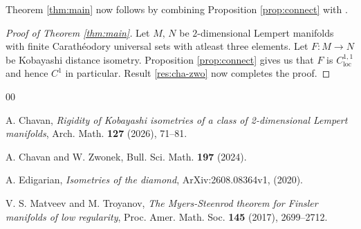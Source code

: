 \documentclass[12pt]{amsart}
\numberwithin{equation}{section}
\theoremstyle{remark}
\begin{document}
Theorem \ref{thm:main} now follows by combining Proposition \ref{prop:connect} with 
\cite[~Theorem 2]{cha-zwo}.

\begin{proof}[Proof of Theorem \ref{thm:main}]
	Let $M,\,N$ be $2$-dimensional Lempert manifolds with finite Carath\'{e}odory
	 universal sets with atleast three elements. Let $F:M\to N$ be Kobayashi distance
	  isometry. Proposition 
	 \ref{prop:connect} gives us that $F$ is $C_{\text{loc}}^{1,1}$ and hence $C^1$ 
	 in particular. Result \ref{res:cha-zwo} now completes the proof. 
\end{proof}





		
	\medskip
	
	
	\begin{thebibliography}{00}
		\smallskip
		
		 A. Chavan, \emph{Rigidity of Kobayashi isometries of a class of
		 2-dimensional Lempert manifolds}, Arch. Math. {\bf 127} (2026), 71--81.
		
		
		 A. Chavan and W. Zwonek, Bull. Sci. Math. {\bf 197} (2024).
		 
		  A. Edigarian, \emph{Isometries of the diamond}, 
		 ArXiv:2608.08364v1, (2020). 
			
		 V. S. Matveev and M. Troyanov, \emph{The Myers-Steenrod theorem for 
		Finsler manifolds of low regularity}, Proc. Amer. Math. Soc. {\bf 145} (2017), 2699--2712. 
		
		
		
		
	\end{thebibliography}
\end{document}
